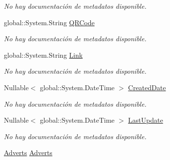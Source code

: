 \begin{DoxyCompactItemize}
\begin{DoxyCompactList}\small\item\em No hay documentación de metadatos disponible. \end{DoxyCompactList}\item 
global\-::\-System.\-String \hyperlink{class_microsoft_1_1_samples_1_1_kinect_1_1_basic_interactions_1_1_catalog_details_a139fa6ef9fbfaadce43840127a5127b1}{Q\-R\-Code}
\begin{DoxyCompactList}\small\item\em No hay documentación de metadatos disponible. \end{DoxyCompactList}\item 
global\-::\-System.\-String \hyperlink{class_microsoft_1_1_samples_1_1_kinect_1_1_basic_interactions_1_1_catalog_details_a92ff466a17ea6948b3dfd91c0d30b612}{Link}
\begin{DoxyCompactList}\small\item\em No hay documentación de metadatos disponible. \end{DoxyCompactList}\item 
Nullable$<$ global\-::\-System.\-Date\-Time $>$ \hyperlink{class_microsoft_1_1_samples_1_1_kinect_1_1_basic_interactions_1_1_catalog_details_aa31ad165f7238ec2c47da48bb5f9d454}{Created\-Date}
\begin{DoxyCompactList}\small\item\em No hay documentación de metadatos disponible. \end{DoxyCompactList}\item 
Nullable$<$ global\-::\-System.\-Date\-Time $>$ \hyperlink{class_microsoft_1_1_samples_1_1_kinect_1_1_basic_interactions_1_1_catalog_details_a43dfdfa238709c3c3c631fcdc8d0767e}{Last\-Update}
\begin{DoxyCompactList}\small\item\em No hay documentación de metadatos disponible. \end{DoxyCompactList}\item 
\hyperlink{class_microsoft_1_1_samples_1_1_kinect_1_1_basic_interactions_1_1_adverts}{Adverts} \hyperlink{class_microsoft_1_1_samples_1_1_kinect_1_1_basic_interactions_1_1_catalog_details_ace1a02ccdb46b1b2a4d454cb013d77a4}{Adverts}

\end{DoxyCompactItemize}
